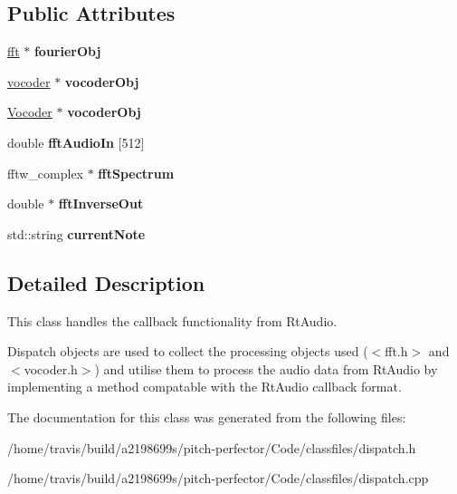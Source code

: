 \subsection*{Public Attributes}
\begin{DoxyCompactItemize}
\item 
\hypertarget{classdispatch_aa4276ec2461afbd1cb98fa4cd9721831}{\hyperlink{classfft}{fft} $\ast$ {\bfseries fourier\-Obj}}\label{classdispatch_aa4276ec2461afbd1cb98fa4cd9721831}

\item 
\hypertarget{classdispatch_a7ccec21b2dce1224744ccaa8d1cafee5}{\hyperlink{classvocoder}{vocoder} $\ast$ {\bfseries vocoder\-Obj}}\label{classdispatch_a7ccec21b2dce1224744ccaa8d1cafee5}

\item 
\hypertarget{classdispatch_a9a7c9726e0a90bdc0e2f2fddcd0ce151}{\hyperlink{classVocoder}{Vocoder} $\ast$ {\bfseries vocoder\-Obj}}\label{classdispatch_a9a7c9726e0a90bdc0e2f2fddcd0ce151}

\item 
\hypertarget{classdispatch_a4716a8409d8ae147bd9035c279fb5dc2}{double {\bfseries fft\-Audio\-In} \mbox{[}512\mbox{]}}\label{classdispatch_a4716a8409d8ae147bd9035c279fb5dc2}

\item 
\hypertarget{classdispatch_a687c3d15b82f8e36bf3aa8ef6b66d3b2}{fftw\-\_\-complex $\ast$ {\bfseries fft\-Spectrum}}\label{classdispatch_a687c3d15b82f8e36bf3aa8ef6b66d3b2}

\item 
\hypertarget{classdispatch_a718894cd35b744d2d6f24f391571c735}{double $\ast$ {\bfseries fft\-Inverse\-Out}}\label{classdispatch_a718894cd35b744d2d6f24f391571c735}

\item 
\hypertarget{classdispatch_a65f2ec3280356247955e42a3e2e07b51}{std\-::string {\bfseries current\-Note}}\label{classdispatch_a65f2ec3280356247955e42a3e2e07b51}

\end{DoxyCompactItemize}


\subsection{Detailed Description}
This class handles the callback functionality from Rt\-Audio. 

Dispatch objects are used to collect the processing objects used ($<$fft.\-h$>$ and $<$vocoder.\-h$>$) and utilise them to process the audio data from Rt\-Audio by implementing a method compatable with the Rt\-Audio callback format. 

The documentation for this class was generated from the following files\-:\begin{DoxyCompactItemize}
\item 
/home/travis/build/a2198699s/pitch-\/perfector/\-Code/classfiles/dispatch.\-h\item 
/home/travis/build/a2198699s/pitch-\/perfector/\-Code/classfiles/dispatch.\-cpp\end{DoxyCompactItemize}
